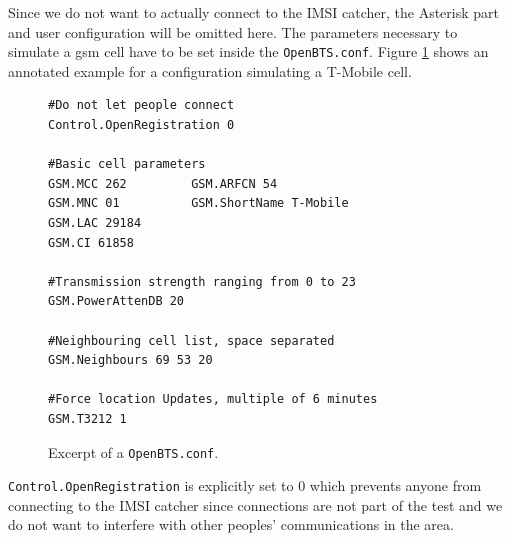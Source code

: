 Since we do not want to actually connect to the IMSI catcher, the Asterisk part and user configuration will be omitted here.
The parameters necessary to simulate a \gls{gsm} cell have to be set inside the \texttt{OpenBTS.conf}.
Figure \ref{fig:openbts_parameters} shows an annotated example for a configuration simulating a T-Mobile cell.
\begin{figure}
\begin{lstlisting}
#Do not let people connect
Control.OpenRegistration 0

#Basic cell parameters
GSM.MCC 262			GSM.ARFCN 54
GSM.MNC 01			GSM.ShortName T-Mobile
GSM.LAC 29184		
GSM.CI 61858
	
#Transmission strength ranging from 0 to 23
GSM.PowerAttenDB 20

#Neighbouring cell list, space separated
GSM.Neighbours 69 53 20

#Force location Updates, multiple of 6 minutes
GSM.T3212 1
\end{lstlisting}
\caption{Excerpt of a \texttt{OpenBTS.conf}.}
\label{fig:openbts_parameters}
\end{figure}
\texttt{Control.OpenRegistration} is explicitly set to 0 which prevents anyone from connecting to the IMSI catcher since connections are not part of the test and we do not want to interfere with other peoples' communications in the area.

